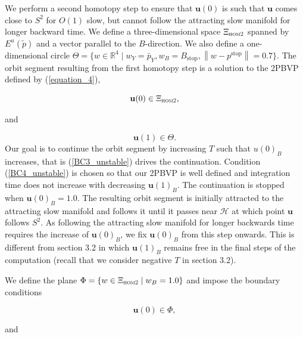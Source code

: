 \documentclass{ws-ijbc}
\begin{document}
We perform a second homotopy step to ensure that $\mathbf{u}(0)$ is such that $\mathbf{u}$ comes close to $S^2$ for $O(1)$ slow, but cannot follow the attracting slow manifold for longer backward time.  We define a three-dimensional space $\Xi_{\textsc{hom2}}$ spanned by $E^u(\tilde{p})$ and a vector parallel to the $B$-direction.  We also define a one-dimensional circle $\Theta = \{ w \in \mathbb{R}^4 \; | \; w_Y=\bar{p}_Y, w_B=B_{\mathrm{stop}}, \left\lVert w-p^{\mathrm{stop}} \right\lVert=0.7\}$.  The orbit segment resulting from the first homotopy step is a solution to the 2PBVP defined by (\ref{equation_4}),

\begin{equation}
\mathbf{u}(0) \in \Xi_{\textsc{hom2}},
\label{BC3_unstable}
\end{equation}

\noindent
and 

\begin{equation}
\mathbf{u}(1) \in \Theta.
\label{BC4_unstable}
\end{equation}
\noindent
Our goal is to continue the orbit segment by increasing $T$ such that $u(0)_B$ increases, that is (\ref{BC3_unstable}) drives the continuation.  Condition (\ref{BC4_unstable}) is chosen so that our 2PBVP is well defined and integration time does not increase with decreasing $\mathbf{u}(1)_B$.  The continuation is stopped when $\mathbf{u}(0)_B =1.0$.  The resulting orbit segment is initially attracted to the attracting slow manifold and follows it until it passes near $\mathscr{H}$ at which point $\mathbf{u}$ follows $S^2$.  As following the attracting slow manifold for longer backwards time requires the increase of $\mathbf{u}(0)_B$, we fix $\mathbf{u}(0)_B$ from this step onwards.  This is different from section 3.2 in which $\mathbf{u}(1)_B$ remains free in the final steps of the computation (recall that we consider negative $T$ in section 3.2).

We define the plane $\Phi = \{w \in \Xi_{\textsc{hom2}} \; | \;  w_B=1.0\}$ and impose the boundary conditions

\begin{equation}
\mathbf{u}(0) \in \Phi,
\label{BC5_unstable}
\end{equation}

\noindent
and 
\end{document}
